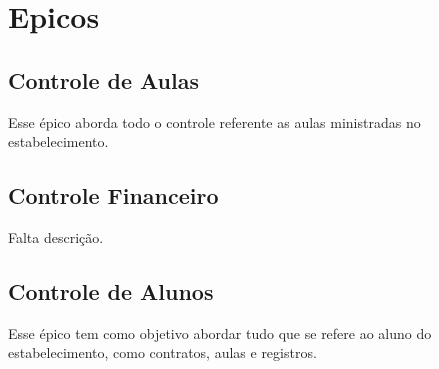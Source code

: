 \section[Epicos]{Epicos}
\subsection[Controle de Aulas]{Controle de Aulas}
Esse épico aborda todo o controle referente as aulas
ministradas no estabelecimento.

\subsection[Controle Financeiro]{Controle Financeiro}
Falta descrição.

\subsection[Controle de Alunos]{Controle de Alunos}
Esse épico tem como objetivo abordar tudo que se refere
ao aluno do estabelecimento, como contratos, aulas e registros.
